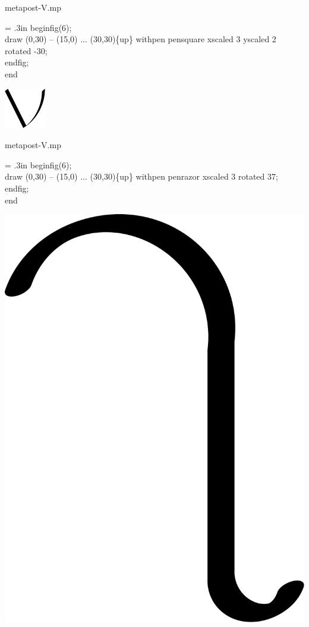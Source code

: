 \documentclass[danish,a2paper,11pt]{scrartcl}
\begin{document}
\begin{multicols*}{3}
\flushleft
\color{White}
\romansmall
metapost-V.mp\\
\vspace{.4cm}
\color{Black}
\typewritersmall
{\leftskip = .3in
beginfig(6);\\
draw (0,30) -- (15,0) ... (30,30)\{up\} withpen pensquare xscaled 3 yscaled 2 rotated -30;\\
endfig;\\
end
\par}
\vspace{2cm}

\center
\includegraphics[scale=4.5]{metapost-pen/metapost-pen-4.pdf}
\vspace{1cm}

\flushleft
\color{White}
\romansmall
metapost-V.mp\\
\vspace{.4cm}
\color{Black}
\typewritersmall
{\leftskip = .3in
beginfig(6);\\
draw (0,30) -- (15,0) ... (30,30)\{up\} withpen penrazor xscaled 3 rotated 37;\\
endfig;\\
end
\par}
\vspace{2cm}

\center
\includegraphics[scale=.25]{draww-1.pdf}
\vspace{-1cm}


\end{multicols*}
\end{document}
